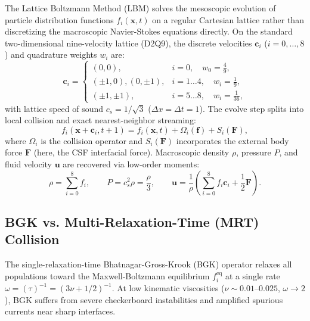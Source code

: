 \documentclass[11pt,a4paper]{article}
\begin{document}
The Lattice Boltzmann Method (LBM) solves the mesoscopic evolution of particle distribution functions $f_i(\mathbf{x}, t)$ on a regular Cartesian lattice rather than discretizing the macroscopic Navier-Stokes equations directly. On the standard two-dimensional nine-velocity lattice (D2Q9), the discrete velocities $\mathbf{c}_i$ ($i = 0, \dots, 8$) and quadrature weights $w_i$ are:
\begin{equation}
    \mathbf{c}_i =
    \begin{cases}
        (0, 0), & i = 0, \quad w_0 = \frac{4}{9}, \\
        (\pm 1, 0), (0, \pm 1), & i = 1\dots 4, \quad w_i = \frac{1}{9}, \\
        (\pm 1, \pm 1), & i = 5\dots 8, \quad w_i = \frac{1}{36},
    \end{cases}
\end{equation}
with lattice speed of sound $c_s = 1/\sqrt{3}$ ($\Delta x = \Delta t = 1$). The evolve step splits into local collision and exact nearest-neighbor streaming:
\begin{equation}
    f_i(\mathbf{x} + \mathbf{c}_i, t + 1) = f_i(\mathbf{x}, t) + \Omega_i(\mathbf{f}) + S_i(\mathbf{F}),
\end{equation}
where $\Omega_i$ is the collision operator and $S_i(\mathbf{F})$ incorporates the external body force $\mathbf{F}$ (here, the CSF interfacial force). Macroscopic density $\rho$, pressure $P$, and fluid velocity $\mathbf{u}$ are recovered via low-order moments:
\begin{equation}
    \rho = \sum_{i=0}^{8} f_i, \qquad P = c_s^2 \rho = \frac{\rho}{3}, \qquad \mathbf{u} = \frac{1}{\rho}\left(\sum_{i=0}^{8} f_i \mathbf{c}_i + \frac{1}{2}\mathbf{F}\right).
\end{equation}

\subsection{BGK vs. Multi-Relaxation-Time (MRT) Collision}

The single-relaxation-time Bhatnagar-Gross-Krook (BGK) operator relaxes all populations toward the Maxwell-Boltzmann equilibrium $f_i^{\mathrm{eq}}$ at a single rate $\omega = (\tau)^{-1} = (3\nu + 1/2)^{-1}$. At low kinematic viscosities ($\nu \sim 0.01\text{--}0.025$, $\omega \to 2$), BGK suffers from severe checkerboard instabilities and amplified spurious currents near sharp interfaces.
\end{document}
